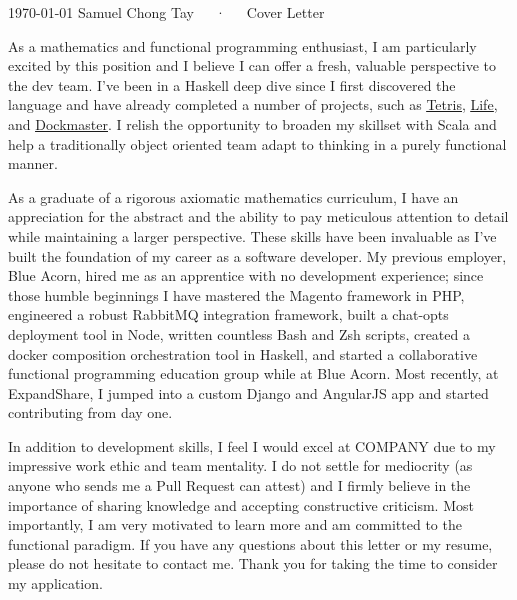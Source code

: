 \documentclass[11pt, a4paper]{awesome-cv}
\begin{document}
\makecvheader

\makecvfooter
  {\today}
  {Samuel Chong Tay~~~·~~~Cover Letter}
  {}

\makelettertitle

\begin{cvletter}

As a mathematics and functional programming enthusiast, I am particularly
  excited by this position and I believe I can offer a fresh, valuable
  perspective to the dev team.  I've been in a Haskell deep dive since I first
  discovered the language and have already completed a number of projects, such
  as \underline{\href{https://github.com/samtay/tetris}{Tetris}},
  \underline{\href{https://github.com/samtay/conway}{Life}}, and
  \underline{\href{https://github.com/samtay/dockmaster}{Dockmaster}}.  I
  relish the opportunity to broaden my skillset with Scala and help a
  traditionally object oriented team adapt to thinking in a purely functional
  manner.

As a graduate of a rigorous axiomatic mathematics curriculum, I have an
  appreciation for the abstract and the ability to pay meticulous attention to
  detail while maintaining a larger perspective.  These skills have been
  invaluable as I've built the foundation of my career as a software developer.
  My previous employer, Blue Acorn, hired me as an apprentice with no
  development experience; since those humble beginnings I have mastered the
  Magento framework in PHP, engineered a robust RabbitMQ integration framework,
  built a chat-opts deployment tool in Node, written countless Bash and Zsh
  scripts, created a docker composition orchestration tool in Haskell, and
  started a collaborative functional programming education group while at Blue
  Acorn.  Most recently, at ExpandShare, I jumped into a custom Django and
  AngularJS app and started contributing from day one.

In addition to development skills, I feel I would excel at COMPANY due to my
  impressive work ethic and team mentality.  I do not settle for mediocrity (as
  anyone who sends me a Pull Request can attest) and I firmly believe in the
  importance of sharing knowledge and accepting constructive criticism.  Most
  importantly, I am very motivated to learn more and am committed to the
  functional paradigm.  If you have any questions about this letter or my
  resume, please do not hesitate to contact me.  Thank you for taking the time
  to consider my application. 

\end{cvletter}

\makeletterclosing
\end{document}
